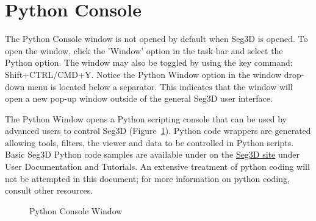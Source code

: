 \documentclass[fleqn,11pt,openany]{book}
\begin{document}
\section{Python Console}
The Python Console window is not opened by default when Seg3D is opened.
To open the window, click the 'Window' option in the task bar and select the Python option.
The window may also be toggled by using the key command: Shift+CTRL/CMD+Y.
Notice the Python Window option in the window drop-down menu is located below a separator.  
This indicates that the window will open a new pop-up window outside of the general Seg3D user interface.

The Python Window opens a Python scripting console that can be used by advanced users to control Seg3D (Figure~\ref{fig:PythonConsole}).
Python code wrappers are generated allowing tools, filters, the viewer and data to be controlled in Python scripts. 
Basic Seg3D Python code samples are available under on the \href{http://www.seg3d.org}{Seg3D site} under User Documentation and Tutorials.
An extensive treatment of python coding will not be attempted in this document;
for more information on python coding, consult other resources.

\begin{figure}[h]
\caption{Python Console Window}\label{fig:PythonConsole}
\end{figure}
\end{document}
